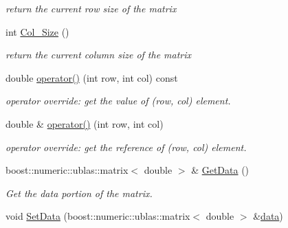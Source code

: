 \begin{CompactItemize}
\begin{CompactList}\small\item\em return the current row size of the matrix \item\end{CompactList}\item 
\hypertarget{class_stoichiometry_matrix_b0c5805caf7e6c1f3517961fbea64940}{
int \hyperlink{class_stoichiometry_matrix_b0c5805caf7e6c1f3517961fbea64940}{Col\_\-Size} ()}
\label{class_stoichiometry_matrix_b0c5805caf7e6c1f3517961fbea64940}

\begin{CompactList}\small\item\em return the current column size of the matrix \item\end{CompactList}\item 
\hypertarget{class_stoichiometry_matrix_3b5cb6732b26dc567b6e9c833dc90310}{
double \hyperlink{class_stoichiometry_matrix_3b5cb6732b26dc567b6e9c833dc90310}{operator()} (int row, int col) const }
\label{class_stoichiometry_matrix_3b5cb6732b26dc567b6e9c833dc90310}

\begin{CompactList}\small\item\em operator override: get the value of (row, col) element. \item\end{CompactList}\item 
double \& \hyperlink{class_stoichiometry_matrix_0bc6ebe7b84a1eeeec7190e4563a4648}{operator()} (int row, int col)
\begin{CompactList}\small\item\em operator override: get the reference of (row, col) element. \item\end{CompactList}\item 
\hypertarget{class_stoichiometry_matrix_95c19b4c68470560affd8afde66ec271}{
boost::numeric::ublas::matrix$<$ double $>$ \& \hyperlink{class_stoichiometry_matrix_95c19b4c68470560affd8afde66ec271}{GetData} ()}
\label{class_stoichiometry_matrix_95c19b4c68470560affd8afde66ec271}

\begin{CompactList}\small\item\em Get the data portion of the matrix. \item\end{CompactList}\item 
\hypertarget{class_stoichiometry_matrix_05629419bfa6ba45ab5c58941d27259a}{
void \hyperlink{class_stoichiometry_matrix_05629419bfa6ba45ab5c58941d27259a}{SetData} (boost::numeric::ublas::matrix$<$ double $>$ \&\hyperlink{class_stoichiometry_matrix_26e7f2350a2b33fa2c02db5b5098a4f0}{data})}
\label{class_stoichiometry_matrix_05629419bfa6ba45ab5c58941d27259a}


\end{CompactItemize}
